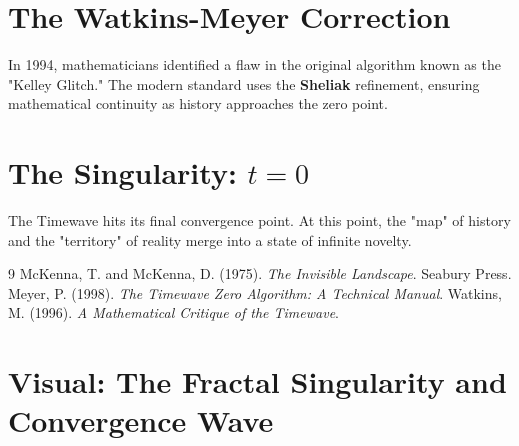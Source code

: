 \documentclass[10pt,twocolumn]{article}
\begin{document}
\section{The Watkins-Meyer Correction}
In 1994, mathematicians identified a flaw in the original algorithm known as the "Kelley Glitch." The modern standard uses the \textbf{Sheliak} refinement, ensuring mathematical continuity as history approaches the zero point.


\section{The Singularity: $t=0$}
The Timewave hits its final convergence point. At this point, the "map" of history and the "territory" of reality merge into a state of infinite novelty.

\begin{thebibliography}{9}
 McKenna, T. and McKenna, D. (1975). \textit{The Invisible Landscape}. Seabury Press.
 Meyer, P. (1998). \textit{The Timewave Zero Algorithm: A Technical Manual}.
 Watkins, M. (1996). \textit{A Mathematical Critique of the Timewave}.
\end{thebibliography}

\onecolumn
\section*{Visual: The Fractal Singularity and Convergence Wave}
\begin{center}
\end{center}
\end{document}
